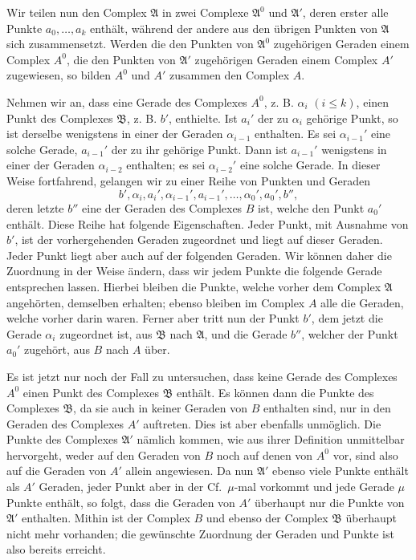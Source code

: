 \documentclass[11pt]{article}
\newcommand{\Cf}{\textup{Cf.}}
\begin{document}
Wir teilen nun den Complex $\mathfrak A$ in zwei Complexe $\mathfrak A^0$ und $\mathfrak A'$, deren erster alle Punkte $a_0,\ldots,a_k$ enthält, während der andere aus den übrigen Punkten von $\mathfrak A$ sich zusammensetzt. Werden die den Punkten von $\mathfrak A^0$ zugehörigen Geraden einem Complex $A^0$, die den Punkten von $\mathfrak A'$ zugehörigen Geraden einem Complex $A'$ zugewiesen, so bilden $A^0$ und $A'$ zusammen den Complex $A$.

Nehmen wir an, dass eine Gerade des Complexes $A^0$, z. B. $\alpha_i$ $(i\leq k)$, einen Punkt des Complexes $\mathfrak B$, z. B. $b'$, enthielte. Ist $a_i'$ der zu $\alpha_i$ gehörige Punkt, so ist derselbe wenigstens in einer der Geraden $\alpha_{i-1}$ enthalten. Es sei $\alpha_{i-1}'$ eine solche Gerade, $a_{i-1}'$ der zu ihr gehörige Punkt. Dann ist $a_{i-1}'$ wenigstens in einer der Geraden $\alpha_{i-2}$ enthalten; es sei $\alpha_{i-2}'$ eine solche Gerade. In dieser Weise fortfahrend, gelangen wir zu einer Reihe von Punkten und Geraden
\[
 b',\alpha_i,a_i',\alpha_{i-1}',a_{i-1}',\ldots,\alpha_0',a_0',b'',
\]
deren letzte $b''$ eine der Geraden des Complexes $B$ ist, welche den Punkt $a_0'$ enthält. Diese Reihe hat folgende Eigenschaften. Jeder Punkt, mit Ausnahme von $b'$, ist der vorhergehenden Geraden zugeordnet und liegt auf dieser Geraden. Jeder Punkt liegt aber auch auf der folgenden Geraden. Wir können daher die Zuordnung in der Weise ändern, dass wir jedem Punkte die folgende Gerade entsprechen lassen. Hierbei bleiben die Punkte, welche vorher dem Complex $\mathfrak A$ angehörten, demselben erhalten; ebenso bleiben im Complex $A$ alle die Geraden, welche vorher darin waren. Ferner aber tritt nun der Punkt $b'$, dem jetzt die Gerade $\alpha_i$ zugeordnet ist, aus $\mathfrak B$ nach $\mathfrak A$, und die Gerade $b''$, welcher der Punkt $a_0'$ zugehört, aus $B$ nach $A$ über.

Es ist jetzt nur noch der Fall zu untersuchen, dass keine Gerade des Complexes $A^0$ einen Punkt des Complexes $\mathfrak B$ enthält. Es können dann die Punkte des Complexes $\mathfrak B$, da sie auch in keiner Geraden von $B$ enthalten sind, nur in den Geraden des Complexes $A'$ auftreten. Dies ist aber ebenfalls unmöglich. Die Punkte des Complexes $\mathfrak A'$ nämlich kommen, wie aus ihrer Definition unmittelbar hervorgeht, weder auf den Geraden von $B$ noch auf denen von $A^0$ vor, sind also auf die Geraden von $A'$ allein angewiesen. Da nun $\mathfrak A'$ ebenso viele Punkte enthält als $A'$ Geraden, jeder Punkt aber in der \Cf\ $\mu$-mal vorkommt und jede Gerade $\mu$ Punkte enthält, so folgt, dass die Geraden von $A'$ überhaupt nur die Punkte von $\mathfrak A'$ enthalten. Mithin ist der Complex $B$ und ebenso der Complex $\mathfrak B$ überhaupt nicht mehr vorhanden; die gewünschte Zuordnung der Geraden und Punkte ist also bereits erreicht.
\end{document}
